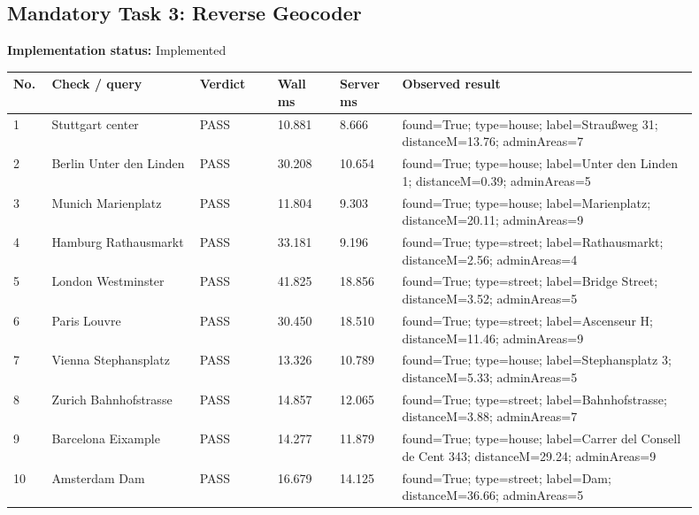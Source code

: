 \documentclass[10pt,a4paper]{article}
\begin{document}
\subsection{Mandatory Task 3: Reverse Geocoder}
\textbf{Implementation status:} Implemented\\
\scriptsize
\begin{longtable}{|P{0.045\linewidth}|P{0.19\linewidth}|P{0.105\linewidth}|P{0.085\linewidth}|P{0.085\linewidth}|P{0.385\linewidth}|}
\hline
\textbf{No.} & \textbf{Check / query} & \textbf{Verdict} & \textbf{Wall ms} & \textbf{Server ms} & \textbf{Observed result}\\ \hline
{} 1 & Stuttgart center & PASS & 10.881 & 8.666 & found=True; type=house; label=Straußweg 31; distanceM=13.76; adminAreas=7\\ \hline
{} 2 & Berlin Unter den Linden & PASS & 30.208 & 10.654 & found=True; type=house; label=Unter den Linden 1; distanceM=0.39; adminAreas=5\\ \hline
{} 3 & Munich Marienplatz & PASS & 11.804 & 9.303 & found=True; type=house; label=Marienplatz; distanceM=20.11; adminAreas=9\\ \hline
{} 4 & Hamburg Rathausmarkt & PASS & 33.181 & 9.196 & found=True; type=street; label=Rathausmarkt; distanceM=2.56; adminAreas=4\\ \hline
{} 5 & London Westminster & PASS & 41.825 & 18.856 & found=True; type=street; label=Bridge Street; distanceM=3.52; adminAreas=5\\ \hline
{} 6 & Paris Louvre & PASS & 30.450 & 18.510 & found=True; type=street; label=Ascenseur H; distanceM=11.46; adminAreas=9\\ \hline
{} 7 & Vienna Stephansplatz & PASS & 13.326 & 10.789 & found=True; type=house; label=Stephansplatz 3; distanceM=5.33; adminAreas=5\\ \hline
{} 8 & Zurich Bahnhofstrasse & PASS & 14.857 & 12.065 & found=True; type=street; label=Bahnhofstrasse; distanceM=3.88; adminAreas=7\\ \hline
{} 9 & Barcelona Eixample & PASS & 14.277 & 11.879 & found=True; type=house; label=Carrer del Consell de Cent 343; distanceM=29.24; adminAreas=9\\ \hline
{} 10 & Amsterdam Dam & PASS & 16.679 & 14.125 & found=True; type=street; label=Dam; distanceM=36.66; adminAreas=5\\ \hline
\end{longtable}
\normalsize
\end{document}
